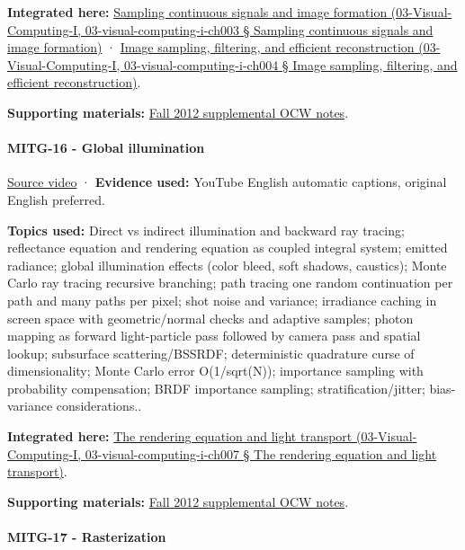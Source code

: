 \textbf{Integrated here:} \href{}{Sampling continuous signals and image formation (03-Visual-Computing-I, 03-visual-computing-i-ch003 § Sampling continuous signals and image formation)} · \href{}{Image sampling, filtering, and efficient reconstruction (03-Visual-Computing-I, 03-visual-computing-i-ch004 § Image sampling, filtering, and efficient reconstruction)}.

\textbf{Supporting materials:} \href{https://ocw.mit.edu/courses/6-837-computer-graphics-fall-2012/pages/lecture-notes/}{Fall 2012 supplemental OCW notes}.

\paragraph{MITG-16 - Global illumination}\label{mitg-16---global-illumination}

\href{https://www.youtube.com/watch?v=xjBwPxU7tUk}{Source video} · \textbf{Evidence used:} YouTube English automatic captions, original English preferred.

\textbf{Topics used:} Direct vs indirect illumination and backward ray tracing; reflectance equation and rendering equation as coupled integral system; emitted radiance; global illumination effects (color bleed, soft shadows, caustics); Monte Carlo ray tracing recursive branching; path tracing one random continuation per path and many paths per pixel; shot noise and variance; irradiance caching in screen space with geometric/normal checks and adaptive samples; photon mapping as forward light-particle pass followed by camera pass and spatial lookup; subsurface scattering/BSSRDF; deterministic quadrature curse of dimensionality; Monte Carlo error O(1/sqrt(N)); importance sampling with probability compensation; BRDF importance sampling; stratification/jitter; bias-variance considerations..

\textbf{Integrated here:} \href{}{The rendering equation and light transport (03-Visual-Computing-I, 03-visual-computing-i-ch007 § The rendering equation and light transport)}.

\textbf{Supporting materials:} \href{https://ocw.mit.edu/courses/6-837-computer-graphics-fall-2012/pages/lecture-notes/}{Fall 2012 supplemental OCW notes}.

\paragraph{MITG-17 - Rasterization}\label{mitg-17---rasterization}

